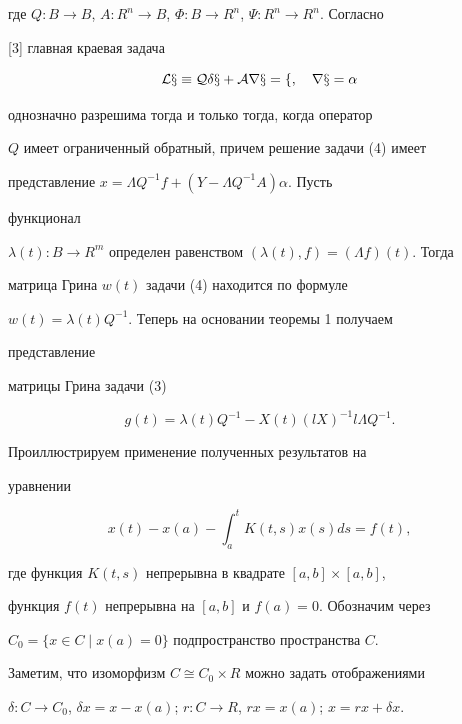 где $Q:B\to B$, $A:R^n\to B$, $\Phi:B\to R^n$, $\Psi:R^n\to R^n$. Согласно 


[3] главная краевая задача 


\begin{equation} 


\cal L x\equiv Q\delta x+A r x=f,\quad r x=\alpha 


\end{equation} 


однозначно разрешима тогда и только тогда, когда оператор 


$Q$ имеет ограниченный обратный, причем решение задачи (4) имеет  


представление $x=\Lambda Q^{-1}f+(Y-\Lambda Q^{-1}A)\alpha$. Пусть 


функционал  


$\lambda(t):B\to R^m$ определен равенством $(\lambda(t),f)=(\Lambda 


f)(t)$. Тогда  


матрица Грина $w(t)$ задачи (4) находится по формуле 


$w(t)=\lambda(t)Q^{-1}$. Теперь на основании теоремы 1 получаем 


представление  


матрицы Грина задачи (3) 


$$ 


g(t)=\lambda(t)Q^{-1}-X(t)(l X)^{-1}l\Lambda Q^{-1}. 


$$ 


 


Проиллюстрируем применение полученных результатов на  


уравнении 


\begin{equation} 


x(t)-x(a)-\int^t_a K(t,s)x(s)d s=f(t), 


\end{equation} 


где функция $K(t,s)$ непрерывна в квадрате $[a,b]\times[a,b]$, 


функция $f(t)$ непрерывна на $[a,b]$ и $f(a)=0$. Обозначим через


$C_0=\{x\in C\mid x(a)=0\}$ подпространство пространства $C$.  


Заметим, что изоморфизм $C\cong C_0\times R$ можно задать отображениями 


$\delta:C\to C_0$, $\delta x=x-x(a)$; $r:C\to R$, $r x=x(a)$; $x=r 


x+\delta x$. 


